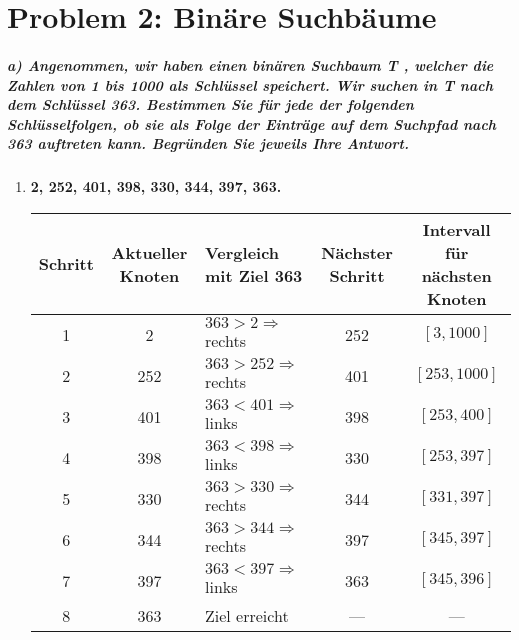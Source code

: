 \section*{{Problem 2: Binäre Suchbäume}} 
\subparagraph*{a) Angenommen, wir haben einen binären Suchbaum T , welcher die Zahlen von
1 bis 1000 als Schlüssel speichert. Wir suchen in T nach dem Schlüssel 363.
Bestimmen Sie für jede der folgenden Schlüsselfolgen, ob sie als Folge der
Einträge auf dem Suchpfad nach 363 auftreten kann. Begründen Sie jeweils
Ihre Antwort.}


\begin{enumerate}
\item \textbf{2, 252, 401, 398, 330, 344, 397, 363.}


\begin{center}
\small
\hspace*{-1.5cm}
\begin{tabular}{@{} c c l c c @{}}
\toprule
\textbf{Schritt} & \textbf{Aktueller Knoten} & \textbf{Vergleich mit Ziel 363} & \textbf{Nächster Schritt} & \textbf{Intervall für nächsten Knoten} \\
\midrule
1 & 2   & \( 363 > 2 \Rightarrow \) rechts & 252 & \([3, 1000]\) \\
2 & 252 & \( 363 > 252 \Rightarrow \) rechts & 401 & \([253, 1000]\) \\
3 & 401 & \( 363 < 401 \Rightarrow \) links & 398 & \([253, 400]\) \\
4 & 398 & \( 363 < 398 \Rightarrow \) links & 330 & \([253, 397]\) \\
5 & 330 & \( 363 > 330 \Rightarrow \) rechts & 344 & \([331, 397]\) \\
6 & 344 & \( 363 > 344 \Rightarrow \) rechts & 397 & \([345, 397]\) \\
7 & 397 & \( 363 < 397 \Rightarrow \) links & 363 & \([345, 396]\) \\
8 & 363 & Ziel erreicht & — & — \\
\bottomrule
\end{tabular}
\end{center}



\end{enumerate}
